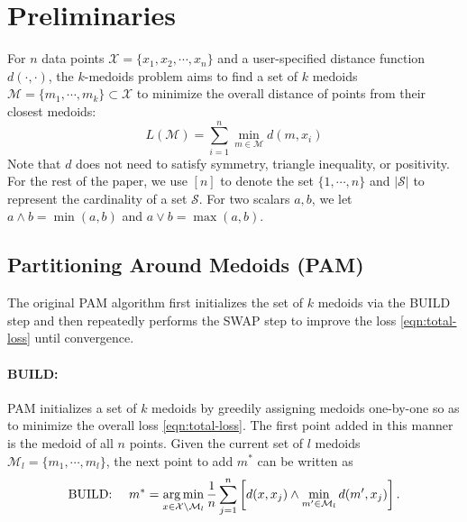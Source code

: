 
\section{Preliminaries \label{sec:prelims}}
For $n$ data points $\mathcal{X} =  \{ x_1, x_2, \cdots, x_n \}$ and a user-specified distance function $d(\cdot, \cdot)$, the $k$-medoids problem aims to find a set of $k$ medoids $\mathcal{M} = \{m_1, \cdots, m_k \} \subset \mathcal{X}$ to minimize the overall distance of points from their closest medoids:
\begin{equation} \label{eqn:total-loss}
	L(\mathcal{M}) =  \sum_{i=1}^n \min_{m \in \mathcal{M}} d(m, x_i)
\end{equation}
Note that $d$ does not need to satisfy symmetry, triangle inequality, or positivity. 
For the rest of the paper, we use $[n]$ to denote the set $\{1,\cdots,n\}$ and $\vert \mathcal{S} \vert$ to represent the cardinality of a set $\mathcal{S}$.
For two scalars $a,b$, we let $a\wedge b = \min(a,b)$ and $a\vee b = \max(a,b)$.

\subsection{Partitioning Around Medoids (PAM)}
The original PAM algorithm \cite{kaufman1987clustering, kaufman1990partitioning} first initializes the set of $k$ medoids via the BUILD step and then repeatedly performs the SWAP step to improve the loss \eqref{eqn:total-loss} until convergence.

\paragraph{BUILD:} PAM initializes a set of $k$ medoids by greedily assigning medoids one-by-one so as to minimize the overall loss \eqref{eqn:total-loss}. 
The first point added in this manner is the medoid of all $n$ points.
Given the current set of $l$ medoids $\mathcal{M}_{l} = \{m_1, \cdots, m_{l}\}$, the next point to add $m^*$ can be written as
\begin{equation}
\label{eqn:build-next-medoid}
    \text{BUILD:~~~~}m^* = \operatorname*{arg\,min}_{x \in \mathcal{X} \setminus \mathcal{M}_{l}} \frac{1}{n} \sum_{j=1}^n \left[d(x, x_j) \wedge \min_{m' \in \mathcal{M}_{l}} d(m', x_j)\right]. 
\end{equation}
